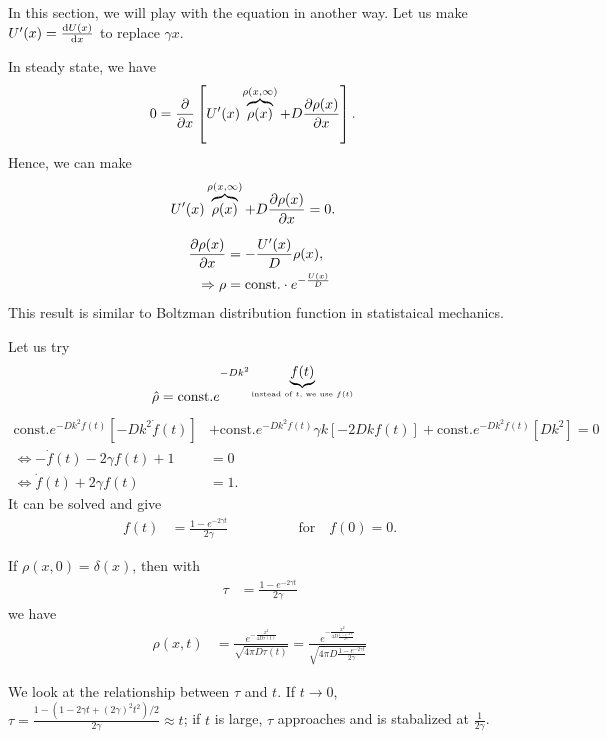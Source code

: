 In this section, we will play with the equation in another way. 
Let us make $ U'(x) = \frac{{\mathrm d} {U(x)}}{{\mathrm d}x} $ to replace $ \gamma x $. 

In steady state, we have
\begin{align}
0 &= \frac{\partial {}}{\partial x} \left[ U'(x)\overbrace{\rho(x)}^{\rho(x,\infty)}+ D \frac{\partial {\rho(x)}}{\partial x} \right].
\end{align}
Hence, we can make
\begin{align}
U'(x)\overbrace{\rho(x)}^{\rho(x,\infty)}+ D \frac{\partial {\rho(x)}}{\partial x} &= 0.
\end{align}

\begin{align}
\frac{\partial {\rho(x)}}{\partial x} &= - \frac{U'(x)}{D} \rho(x),\\
\Rightarrow \rho &= \mathrm{const.}\cdot e^{-\frac{U(x)}{D}}
\end{align}
This result is similar to Boltzman distribution function in statistaical mechanics. 

Let us try 
\begin{align}
\hat{\rho} &= \mathrm{const.} e^{-Dk^2 \underbrace{f(t)}_{\text{instead of $ t $, we use $ f(t) $}}}
\end{align}
\begin{align}
\mathrm{const.} e^{-Dk^2 f(t)} \left[ -Dk^2 \dot{f}(t) \right] &+ \mathrm{const.} e^{-Dk^2 f(t)} \gamma k\left[ -2Dkf(t) \right] + \mathrm{const.} e^{-Dk^2 f(t)} \left[ Dk^2 \right] =0\\
\Leftrightarrow -\dot{f}(t) - 2\gamma f(t) +1 &=0\\
\Leftrightarrow \dot{f}(t) + 2\gamma f(t) &=1.
\end{align}
It can be solved and give
\begin{align}
f(t) &= \frac{1- e^{-2\gamma t}}{2\gamma}\quad\qquad \qquad \mathrm{for } \quad f(0)=0.
\end{align}

If $ \rho(x,0) =\delta(x) $, then with 
\begin{align}
\tau &= \frac{1- e^{-2\gamma t}}{2\gamma}
\end{align}
we have 
\begin{align}
\rho (x,t) &= \frac{e^{-\frac{x^2}{4D\tau(t)} }}{\sqrt{4\pi D\tau(t)}} 
= \frac{e^{-\frac{x^2}{4D\frac{1- e^{-2\gamma t}}{2\gamma}} }}{\sqrt{4\pi D\frac{1- e^{-2\gamma t}}{2\gamma}}}
\end{align}

We look at the relationship between $ \tau  $ and $ t $. If $ t\rightarrow 0 $, $ \tau = \frac{1-(1-2\gamma t+(2\gamma)^2t^2)/2}{2\gamma}\approx t $; if $ t $ is large, $ \tau $ approaches and is stabalized at $ \frac{1}{2\gamma} $. 


